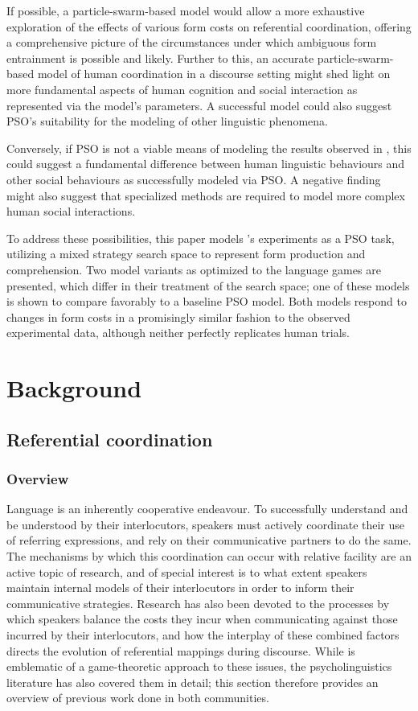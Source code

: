 \documentclass[12pt,a4paper]{article}
\begin{document}
If possible, a particle-swarm-based model would allow a more exhaustive exploration of the effects of various form costs on referential coordination, offering a comprehensive picture of the circumstances under which ambiguous form entrainment is possible and likely. Further to this, an accurate particle-swarm-based model of human coordination in a discourse setting might shed light on more fundamental aspects of human cognition and social interaction as represented via the model's parameters. A successful model could also suggest PSO's suitability for the modeling of other linguistic phenomena. 

Conversely, if PSO is not a viable means of modeling the results observed in \citeauthor{rohde2012}, this could suggest a fundamental difference between human linguistic behaviours and other social behaviours as successfully modeled via PSO. A negative finding might also suggest that specialized methods are required to model more complex human social interactions.

To address these possibilities, this paper models \citeauthor{rohde2012}'s experiments as a PSO task, utilizing a mixed strategy search space to represent form production and comprehension. Two model variants as optimized to the \citeauthor{rohde2012} language games are presented, which differ in their treatment of the search space; one of these models is shown to compare favorably to a baseline PSO model. Both models respond to changes in form costs in a promisingly similar fashion to the observed experimental data, although neither perfectly replicates human trials.


\section{Background}
\subsection{Referential coordination}
\subsubsection{Overview}
Language is an inherently cooperative endeavour. To successfully understand and be understood by their interlocutors, speakers must actively coordinate their use of referring expressions, and rely on their communicative partners to do the same. The mechanisms by which this coordination can occur with relative facility are an active topic of research, and of special interest is to what extent speakers maintain internal models of their interlocutors in order to inform their communicative strategies. Research has also been devoted to the processes by which speakers balance the costs they incur when communicating against those incurred by their interlocutors, and how the interplay of these combined factors directs the evolution of referential mappings during discourse. While \citeauthor{rohde2012} is emblematic of a game-theoretic approach to these issues, the psycholinguistics literature has also covered them in detail; this section therefore provides an overview of previous work done in both communities.
\end{document}
